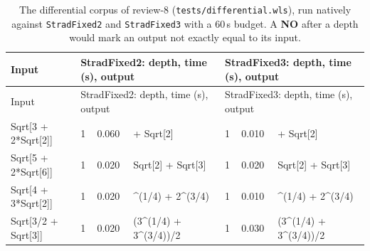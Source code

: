 \begin{longtable}{@{}>{\ttfamily\footnotesize\raggedright\arraybackslash}p{}p{}p{}>{\ttfamily\footnotesize\raggedright\arraybackslash}p{}p{}p{}>{\ttfamily\footnotesize\raggedright\arraybackslash}p{}@{}}
\caption{The differential corpus of review-8 (\texttt{tests/differential.wls}), run natively against \texttt{StradFixed2} and \texttt{StradFixed3} with a 60\,s budget. A \textbf{NO} after a depth would mark an output not exactly equal to its input.}\label{tab:diff}\\
\toprule Input & \multicolumn{3}{l}{StradFixed2: depth, time (s), output} & \multicolumn{3}{l}{StradFixed3: depth, time (s), output}\\\midrule\endfirsthead
\toprule Input & \multicolumn{3}{l}{StradFixed2: depth, time (s), output} & \multicolumn{3}{l}{StradFixed3: depth, time (s), output}\\\midrule\endhead
\bottomrule\endfoot
Sqrt[\allowbreak{}3 +\allowbreak{} 2*\allowbreak{}Sqrt[\allowbreak{}2]\allowbreak{}]\allowbreak{} & 1 & 0.060 & 1 +\allowbreak{} Sqrt[\allowbreak{}2]\allowbreak{} & 1 & 0.010 & 1 +\allowbreak{} Sqrt[\allowbreak{}2]\allowbreak{}\\
Sqrt[\allowbreak{}5 +\allowbreak{} 2*\allowbreak{}Sqrt[\allowbreak{}6]\allowbreak{}]\allowbreak{} & 1 & 0.020 & Sqrt[\allowbreak{}2]\allowbreak{} +\allowbreak{} Sqrt[\allowbreak{}3]\allowbreak{} & 1 & 0.020 & Sqrt[\allowbreak{}2]\allowbreak{} +\allowbreak{} Sqrt[\allowbreak{}3]\allowbreak{}\\
Sqrt[\allowbreak{}4 +\allowbreak{} 3*\allowbreak{}Sqrt[\allowbreak{}2]\allowbreak{}]\allowbreak{} & 1 & 0.020 & 2\textasciicircum{}\allowbreak{}(\allowbreak{}1/\allowbreak{}4)\allowbreak{} +\allowbreak{} 2\textasciicircum{}\allowbreak{}(\allowbreak{}3/\allowbreak{}4)\allowbreak{} & 1 & 0.010 & 2\textasciicircum{}\allowbreak{}(\allowbreak{}1/\allowbreak{}4)\allowbreak{} +\allowbreak{} 2\textasciicircum{}\allowbreak{}(\allowbreak{}3/\allowbreak{}4)\allowbreak{}\\
Sqrt[\allowbreak{}3/\allowbreak{}2 +\allowbreak{} Sqrt[\allowbreak{}3]\allowbreak{}]\allowbreak{} & 1 & 0.020 & (\allowbreak{}3\textasciicircum{}\allowbreak{}(\allowbreak{}1/\allowbreak{}4)\allowbreak{} +\allowbreak{} 3\textasciicircum{}\allowbreak{}(\allowbreak{}3/\allowbreak{}4)\allowbreak{})\allowbreak{}/\allowbreak{}2 & 1 & 0.030 & (\allowbreak{}3\textasciicircum{}\allowbreak{}(\allowbreak{}1/\allowbreak{}4)\allowbreak{} +\allowbreak{} 3\textasciicircum{}\allowbreak{}(\allowbreak{}3/\allowbreak{}4)\allowbreak{})\allowbreak{}/\allowbreak{}2\\

\end{longtable}
